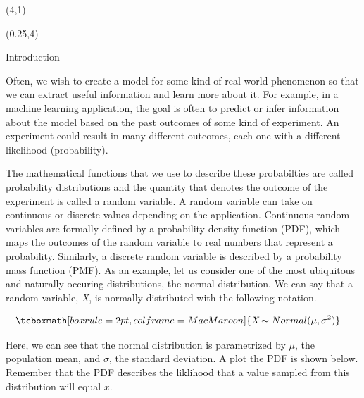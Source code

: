 \documentclass[22pt]{beamer}
\begin{document}
\begin{frame}[fragile]
\begin{textblock}{8}(4,1)
\titlepage
\end{textblock}

\begin{textblock}{5}(0.25,4)


\begin{block}{Introduction}
\justifying

\tiny{Often, we wish to create a model for some kind of real world phenomenon so that we can extract useful information and learn more about it. For example, in a machine learning application, the goal is often to predict or infer information about the model based on the past outcomes of some kind of experiment. An experiment could result in many  different outcomes, each one with a different likelihood (probability).}

\bigskip

\tiny{The mathematical functions that we use to describe these probabilties are called probability distributions and the quantity that denotes the outcome of the experiment is called a random variable. A random variable can take on continuous or discrete values depending on the application. Continuous random variables are formally defined by a probability density function (PDF), which maps the outcomes of the random variable to real numbers that represent a probability. Similarly, a discrete random variable is described by a probability mass function (PMF). As an example, let us consider one of the most ubiquitous and naturally occuring distributions, the normal distribution. We can say that a random variable, \textit{X}, is normally distributed with the following notation. }

\begin{equation*}
\begin{aligned}
& \tcboxmath[boxrule=2pt,colframe=MacMaroon]{\textit{X} \sim Normal(\mu, \sigma^2)}
\end{aligned}
\end{equation*}

\bigskip
\tiny{Here, we can see that the normal distribution is parametrized by $\mu$, the population mean, and $\sigma$, the standard deviation. A plot the PDF is shown below. Remember that the PDF describes the liklihood that a value sampled from this distribution will equal $x$.}


\end{block}
\end{textblock}
\end{frame}
\end{document}
